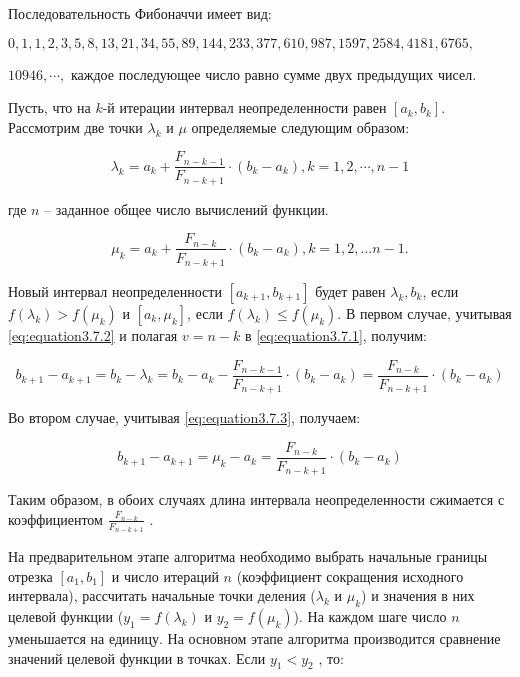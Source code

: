 Последовательность Фибоначчи имеет вид: 

$0, 1, 1, 2, 3, 5, 8, 13, 21, 34, 55, 89, 144, 233, 377, 610, 987, 1597, 2584, 4181, 6765,$ 

$10946,\cdots,$ каждое последующее число равно сумме двух предыдущих чисел.

Пусть, что на  $k$-й итерации интервал неопределенности равен $[a_k, b_k]$. Рассмотрим две точки $\lambda_k$ и $\mu$ определяемые следующим образом:

\begin{equation}
\label{eq:equation3.7.2}
\lambda_k = a_k + \frac{F_{n-k-1}}{F_{n-k+1}} \cdot (b_k - a_k), k=1,2,\cdots, n-1
\end{equation} 

где $n$ – заданное общее число вычислений функции.

\begin{equation}
\label{eq:equation3.7.3}
\mu_k = a_k + \frac{F_{n-k}}{F_{n-k+1}} \cdot (b_k - a_k), k = 1,2,...n-1.	
\end{equation} 

Новый интервал неопределенности $[a_{k+1},b_{k+1}]$ будет равен $\lambda_k, b_k$, если $f(\lambda_k) > f(\mu_k)$ и $[a_k, \mu_k]$, если $f(\lambda_k) \leq f(\mu_k)$. В первом случае, учитывая \ref{eq:equation3.7.2} и полагая $v = n-k$ в \ref{eq:equation3.7.1}, получим:

\begin{equation}
\label{eq:equation3.7.4}
b_{k+1} - a_{k+1} = b_k - \lambda_k = b_k - a_k - \frac{F_{n-k-1}}{F_{n-k+1}} \cdot (b_k - a_k) = \frac{F_{n-k}}{F_{n-k+1}} \cdot (b_k - a_k)
\end{equation} 

Во втором случае, учитывая \ref{eq:equation3.7.3}, получаем:

\begin{equation}
\label{eq:equation3.7.5}
b_{k+1} - a_{k+1} = \mu_k - a_k = \frac{F_{n-k}}{F_{n-k+1}} \cdot (b_k - a_k)
\end{equation} 

Таким образом, в обоих случаях длина интервала неопределенности сжимается с коэффициентом $\frac{F_{n-k}}{F_{n-k+1}}$ .

На предварительном этапе алгоритма необходимо выбрать начальные границы отрезка $[a_1, b_1]$ и число итераций $n$ (коэффициент сокращения исходного интервала), рассчитать начальные точки деления ($\lambda_k$ и $\mu_k$) и значения в них целевой функции ($y_1 = f (\lambda_k)$  и $y_2 = f (\mu_k)$). На каждом шаге число $n$ уменьшается на единицу. На основном этапе алгоритма производится сравнение значений целевой функции в точках. Если $y_1 < y_2$ , то:

